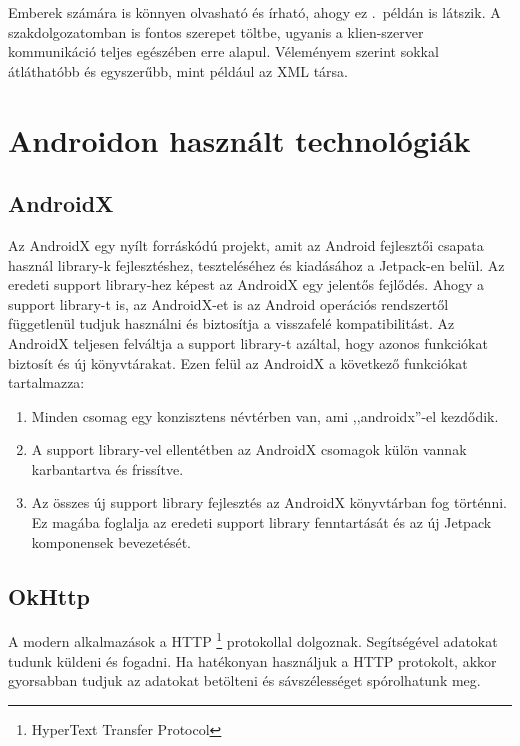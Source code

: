 \documentclass{thesis-ekf}
\theoremstyle{definition}
\theoremstyle{remark}
\begin{document}
Emberek számára is könnyen olvasható és írható, ahogy ez .~példán is látszik. 
A szakdolgozatomban is fontos szerepet töltbe, ugyanis a klien-szerver kommunikáció teljes egészében erre alapul.
Véleményem szerint sokkal átláthatóbb és egyszerűbb, mint például az XML társa.

\section{Androidon használt technológiák}

\subsection{AndroidX}

Az AndroidX egy nyílt forráskódú projekt, amit az Android fejlesztői csapata használ library-k fejlesztéshez, teszteléséhez és kiadásához a Jetpack-en belül.
Az eredeti support library-hez képest az AndroidX egy jelentős fejlődés. Ahogy a support library-t is, az AndroidX-et is az Android operációs rendszertől függetlenül tudjuk használni és biztosítja a visszafelé kompatibilitást.
Az AndroidX teljesen felváltja a support library-t azáltal, hogy azonos funkciókat biztosít és új könyvtárakat.
Ezen felül az AndroidX a következő funkciókat tartalmazza:

\begin{enumerate}
	\item Minden csomag egy konzisztens névtérben van, ami ,,androidx''-el kezdődik.
	\item A support library-vel ellentétben az AndroidX csomagok külön vannak karbantartva és frissítve.
	\item Az összes új support library fejlesztés az AndroidX könyvtárban fog történni. Ez magába foglalja az eredeti support library fenntartását és az új Jetpack komponensek bevezetését.
\end{enumerate}


\subsection{OkHttp}

A modern alkalmazások a HTTP \footnote{HyperText Transfer Protocol} protokollal dolgoznak. 
Segítségével adatokat tudunk küldeni és fogadni.
Ha hatékonyan használjuk a HTTP protokolt, akkor gyorsabban tudjuk az adatokat betölteni és sávszélességet spórolhatunk meg. 
\end{document}

